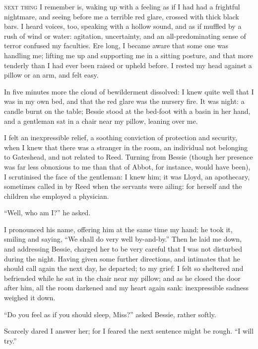 
 \textsc{next thing} I remember is, waking up with a feeling as if I had had a
frightful nightmare, and seeing before me a terrible red glare, crossed
with thick black bars.  I heard voices, too, speaking with a hollow
sound, and as if muffled by a rush of wind or water: agitation,
uncertainty, and an all-predominating sense of terror confused my
faculties.  Ere long, I became aware that some one was handling me;
lifting me up and supporting me in a sitting posture, and that more
tenderly than I had ever been raised or upheld before.  I rested my head
against a pillow or an arm, and felt easy.

In five minutes more the cloud of bewilderment dissolved: I knew quite
well that I was in my own bed, and that the red glare was the nursery
fire.  It was night: a candle burnt on the table; Bessie stood at the
bed-foot with a basin in her hand, and a gentleman sat in a chair near
my pillow, leaning over me.

I felt an inexpressible relief, a soothing conviction of protection and
security, when I knew that there was a stranger in the room, an
individual not belonging to Gateshead, and not related to \Mrs{} Reed.
Turning from Bessie (though her presence was far less obnoxious to me
than that of Abbot, for instance, would have been), I scrutinised the
face of the gentleman: I knew him; it was \Mr{} Lloyd, an apothecary,
sometimes called in by \Mrs{} Reed when the servants were ailing: for
herself and the children she employed a physician.

\enquote{Well, who am I?} he asked.

I pronounced his name, offering him at the same time my hand: he took
it, smiling and saying, \enquote{We shall do very well by-and-by.}  Then
he laid me down, and addressing Bessie, charged her to be very careful
that I was not disturbed during the night.  Having given some further
directions, and intimates that he should call again the next day, he
departed; to my grief: I felt so sheltered and befriended while he sat
in the chair near my pillow; and as he closed the door after him, all
the room darkened and my heart again sank: inexpressible sadness weighed
it down.

\enquote{Do you feel as if you should sleep, Miss?} asked Bessie, rather
softly.

Scarcely dared I answer her; for I feared the next sentence might be
rough.  \enquote{I will try.}

